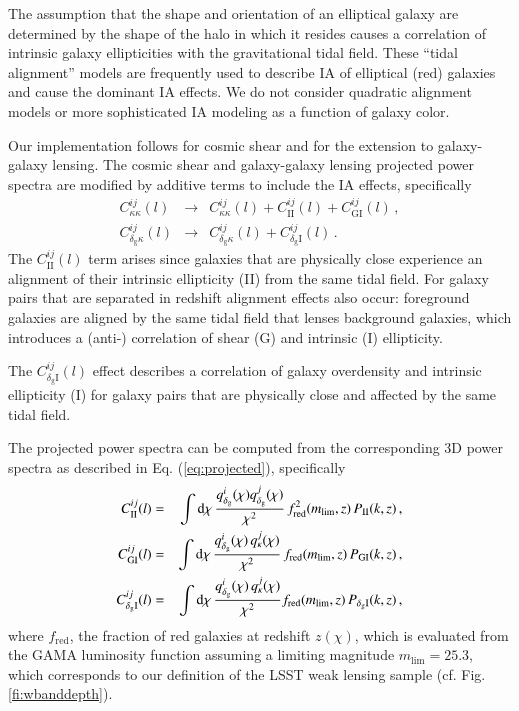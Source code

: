 \documentclass[fleqn,usenatbib,useAMS]{mnras}
\newcommand{\bea}{\begin{eqnarray}}
\newcommand{\eea}{\end{eqnarray}}
\renewcommand{\d}{{\rm d}}
\newcommand{\mr}{\mathrm}
\begin{document}
The assumption that the shape and orientation of an elliptical galaxy are determined by the shape of the halo in which it resides causes a correlation of intrinsic galaxy ellipticities with the gravitational tidal field. These ``tidal alignment'' models are frequently used to describe IA of elliptical (red) galaxies and cause the dominant IA effects. We do not consider quadratic alignment models or more sophisticated IA modeling as a function of galaxy color. 

Our implementation follows \cite{keb16} for cosmic shear and \cite{kre17} for the extension to galaxy-galaxy lensing. The cosmic shear and galaxy-galaxy lensing projected power spectra are modified by additive terms to include the IA effects, specifically 
\bea
\label{eq:CgI}
C_{\kappa \kappa}^{ij}(l) &\rightarrow& C_{\kappa \kappa}^{ij}(l) + C_\mathrm{II}^{ij}(l) + C_\mathrm{GI}^{ij}(l) \,, \\
C_{\delta_{\mathrm{g}}\kappa}^{ij}(l) &\rightarrow& C_{\delta_{\mathrm{g}}\kappa}^{ij}(l) + C_{\delta_{\mathrm{g}}\mr I}^{ij}(l) \,.
\eea
The $C_\mathrm{II}^{ij}(l)$ term arises since galaxies that are physically close experience  an alignment of their intrinsic ellipticity (II) from the same tidal field. For galaxy pairs that are separated in redshift alignment effects also occur: foreground galaxies are aligned by the same tidal field that lenses background galaxies, which introduces a (anti-) correlation of shear (G) and intrinsic (I) ellipticity.

The $C_{\delta_{\mathrm{g}}\mr I}^{ij}(l)$ effect describes a correlation of galaxy overdensity and intrinsic ellipticity (I) for galaxy pairs that are physically close and affected by the same tidal field. 

The projected power spectra can be computed from the corresponding 3D power spectra as described in Eq. (\ref{eq:projected}), specifically
\bea\label{eq:IA1}
C_\mr{II}^{ij} (l) &=&  \int \d \chi \, \frac{q^i_{\delta_{\mathrm{g}}} (\chi) q^j_{\delta_{\mathrm{g}}} (\chi)}{\chi^2} \, f_\mr{red}^2(m_{\mathrm{lim}},z)\, P_\mr{I I} (k,z) \,, \\
\label{eq:IA2}
C_\mr{GI}^{ij} (l) &=&  \int \d \chi \, \frac{q^i_{\delta_{\mathrm{g}}} (\chi) \,  q^j_\kappa (\chi)}{\chi^2}  \, f_\mr{red}(m_{\mathrm{lim}},z)\, P_\mr{G I} (k,z) \,, \\
\label{eq:IA3}
C_{\delta_{\mathrm{g}}\mr I}^{ij}(l) &=& \int \d \chi \, \frac{q^i_{\delta_{\mathrm{g}}} (\chi) \,  q^j_\kappa (\chi)}{\chi^2} f_{\mathrm{red}}(m_{\mathrm{lim}},z) \, P_\mr{\delta_g I}(k,z) \,,
\eea
where $f_{\mr{red}}$, the fraction of red galaxies at redshift $z(\chi)$, which is evaluated from the GAMA luminosity function assuming a limiting magnitude $m_{\mathrm{lim}} = 25.3$, which corresponds to our definition of the LSST weak lensing sample (cf. Fig. \ref{fi:wbanddepth}).
\end{document}
